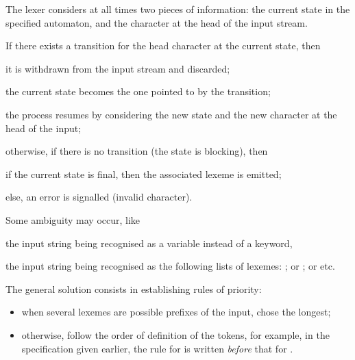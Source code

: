 \documentclass[12pt,a4paper]{article}
\begin{document}
The lexer considers at all times two pieces of information:
the current state in the specified automaton, and the character at the
head of the input stream.
\begin{itemize*}

  \item If there exists a transition for the head character at the
    current state, then
    \begin{itemize*}

      \item it is withdrawn from the input stream and discarded;

      \item the current state becomes the one pointed to by the
        transition;

      \item the process resumes by considering the new state and the
        new character at the head of the input;

    \end{itemize*}

  \item otherwise, if there is no transition (the state is blocking),
    then
    \begin{itemize*}

      \item if the current state is final, then the associated lexeme
        is emitted;

      \item else, an error is signalled (invalid character).

    \end{itemize*}

\end{itemize*}
Some ambiguity may occur, like
\begin{itemize*}

   \item the input string  being recognised as a variable
     instead of a keyword,

   \item the input string  being recognised as the
     following lists of lexemes: \lbra\Tlet; \Tident {}\rbra{}
     or \lbra\Tlet; \Trec\rbra{} or \lbra\Tident {}\rbra{}
     etc.

\end{itemize*}
The general solution consists in establishing rules of priority:
\begin{itemize}

   \item when several lexemes are possible prefixes of the input, chose
     the longest;

   \item otherwise, follow the order of definition of the tokens, for
     example, in the \ocamllex specification given earlier, the rule
     for \Tlet is written \emph{before} that for .

\end{itemize}
\end{document}
